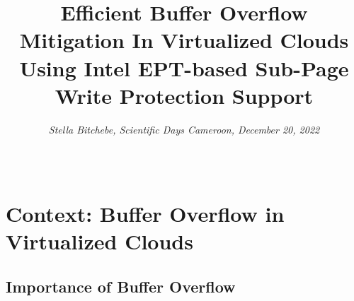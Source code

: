 \documentclass[xcolor=table,bigger,unknownkeysallowed]{beamer}
\title{Efficient Buffer Overflow Mitigation In Virtualized Clouds Using Intel EPT-based Sub-Page Write
Protection Support}
\author{\textit{Stella Bitchebe, Scientific Days Cameroon, December 20, 2022}}
\date{~}
\begin{document}

\section{Context: Buffer Overflow in Virtualized Clouds}
\subsection{Importance of Buffer Overflow}
\end{document}
